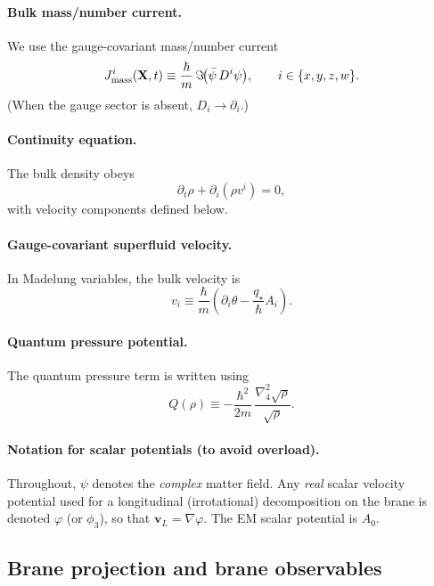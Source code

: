 \documentclass[11pt]{article}
\newcommand{\qstar}{q_\star}
\begin{document}
\paragraph{Bulk mass/number current.}
We use the gauge-covariant mass/number current
\begin{equation}
  J^i_{\rm mass}(\mathbf X,t) \equiv \frac{\hbar}{m}\,\Im\!\big(\bar\psi\,D^i\psi\big),
  \qquad i\in\{x,y,z,w\}.
\end{equation}
(When the gauge sector is absent, $D_i\to \partial_i$.)

\paragraph{Continuity equation.}
The bulk density obeys
\begin{equation}
  \partial_t \rho + \partial_i(\rho v^i)=0,
\end{equation}
with velocity components defined below.

\paragraph{Gauge-covariant superfluid velocity.}
In Madelung variables, the bulk velocity is
\begin{equation}
  v_i \equiv \frac{\hbar}{m}\left(\partial_i\theta-\frac{\qstar}{\hbar}A_i\right).
\end{equation}

\paragraph{Quantum pressure potential.}
The quantum pressure term is written using
\begin{equation}
  Q(\rho)\equiv -\frac{\hbar^2}{2m}\,\frac{\nabla_4^2\sqrt{\rho}}{\sqrt{\rho}}.
\end{equation}

\paragraph{Notation for scalar potentials (to avoid overload).}
Throughout, $\psi$ denotes the \emph{complex} matter field. Any \emph{real} scalar velocity potential used
for a longitudinal (irrotational) decomposition on the brane is denoted $\varphi$ (or $\phi_3$),
so that $\mathbf v_L = \nabla \varphi$. The EM scalar potential is $A_0$.

\subsection{Brane projection and brane observables}
\end{document}
